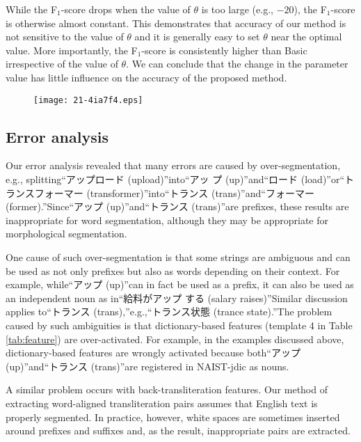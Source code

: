 \documentclass[english]{jnlp_1.4_rep}
\begin{document}
While the F$_{1}$-score drops when the value of $\theta$ is too large
(e.g., $-20$), the F$_{1}$-score is otherwise almost constant. This
demonstrates that accuracy of our method is not sensitive to the value
of $\theta$ and it is generally easy to set $\theta$ near the optimal
value. More importantly, the F$_1$-score is consistently higher than
{\sc Basic} irrespective of the value of $\theta$. We can conclude that 
the change in the parameter value has little influence on the accuracy
of the proposed method.

\begin{figure}[t]
 \begin{center}
\texttt{[image: 21-4ia7f4.eps]}
 \end{center}
  \label{fig:threshold}
\end{figure}



\subsection{Error analysis}
\label{subsec:error}

Our error analysis revealed that many errors are caused by
over-segmentation, e.g., splitting“アップロード (upload)”into“アッ
プ (up)”and“ロード (load)”or“トランスフォーマー (transformer)”into“トランス (trans)”and“フォーマー (former).”Since“アップ
(up)”and“トランス (trans)”are prefixes, these results are
inappropriate for word segmentation, although they may be appropriate for
morphological segmentation.

One cause of such over-segmentation is that some strings are ambiguous
and can be used as not only prefixes but also as words depending on their
context. For example, while“アップ (up)”can in fact be used as a
prefix, it can also be used as an independent noun as in“給料がアップ
する (salary raises)”Similar discussion applies to“トランス
(trans),”e.g.,“トランス状態 (trance state).”The problem caused by
such ambiguities is that dictionary-based features (template 4 in Table
\ref{tab:feature}) are over-activated. For example, in the examples
discussed above, dictionary-based features are wrongly activated because
both“アップ (up)”and“トランス (trans)”are registered in
NAIST-jdic as nouns.

A similar problem occurs with back-transliteration features. Our method
of extracting word-aligned transliteration pairs assumes that English
text is properly segmented. In practice, however, white spaces are
sometimes inserted around prefixes and suffixes and, as the result,
inappropriate pairs are extracted.
\end{document}
